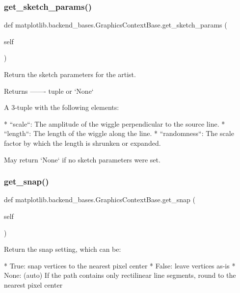 \subsubsection{\texorpdfstring{get\+\_\+sketch\+\_\+params()}{get\_sketch\_params()}}
{\footnotesize\ttfamily def matplotlib.\+backend\+\_\+bases.\+Graphics\+Context\+Base.\+get\+\_\+sketch\+\_\+params (\begin{DoxyParamCaption}\item[{}]{self }\end{DoxyParamCaption})}

\begin{DoxyVerb}Return the sketch parameters for the artist.

Returns
-------
tuple or `None`

    A 3-tuple with the following elements:

    * ``scale``: The amplitude of the wiggle perpendicular to the
      source line.
    * ``length``: The length of the wiggle along the line.
    * ``randomness``: The scale factor by which the length is
      shrunken or expanded.

    May return `None` if no sketch parameters were set.
\end{DoxyVerb}
 \mbox{\label{classmatplotlib_1_1backend__bases_1_1GraphicsContextBase_a61d8ce359998f583502cbc32676084dc}} 
\subsubsection{\texorpdfstring{get\+\_\+snap()}{get\_snap()}}
{\footnotesize\ttfamily def matplotlib.\+backend\+\_\+bases.\+Graphics\+Context\+Base.\+get\+\_\+snap (\begin{DoxyParamCaption}\item[{}]{self }\end{DoxyParamCaption})}

\begin{DoxyVerb}Return the snap setting, which can be:

* True: snap vertices to the nearest pixel center
* False: leave vertices as-is
* None: (auto) If the path contains only rectilinear line segments,
  round to the nearest pixel center
\end{DoxyVerb}
 \mbox{\label{classmatplotlib_1_1backend__bases_1_1GraphicsContextBase_af3eb5ab2cc68479cf02576639d09b382}} 
